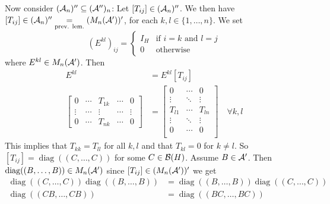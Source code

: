 \documentclass[10pt,english,a4paper]{article}
\theoremstyle{definition}
\DeclareMathOperator{\diag}{diag}
\begin{document}
Now consider $(\mathcal{A}_n)'' \subseteq (\mathcal{A}'')_n$:
Let $[T_{ij}] \in (\mathcal{A}_n)''$. We then have 
$[T_{ij}] \in (\mathcal{A}_n)'' \underset{\text{prev. lem.}}{=} (M_n(\mathcal{A}'))'$, for 
each $k,l \in \{1,\ldots,n\}$. 
We set 
\[(E^{kl})_{ij} = \begin{cases} 
I_H &  \text{if } i =k \text{ and } l=j \\
 0 &\text{otherwise} \end{cases}\] 
where $E^{kl} \in M_{n}(\mathcal{A}')$. Then 
\begin{align*}
    [T_{ij}]E^{kl} &= E^{kl}[T_{ij}] \\
    \begin{bmatrix} 
       0 &\cdots & T_{1k} &\cdots & 0 \\
       \vdots &\cdots & \vdots &\cdots &\vdots \\
       0 &\cdots & T_{nk} & \cdots & 0
    \end{bmatrix}
&=
    \begin{bmatrix} 
       0   &\cdots & 0 \\
       \vdots &\ddots &\vdots \\
       T_{l1} &  \cdots & T_{ln} \\
       \vdots  &\ddots &\vdots \\
       0   &\cdots & 0 \\
    \end{bmatrix}
\quad\forall k,l
\end{align*}
This implies that $T_{kk} = T_{ll}$ for all $k,l$
and that $T_{kl} = 0$ for $k\neq l$.
So $[T_{ij}] = \diag((C,\ldots,C))$
for some $C \in \mathcal{B}(H)$. Assume $B \in \mathcal{A}'$. Then $\diag((B,\ldots,B))\in M_n(\As')$
since $[T_{ij}] \in (M_n(\mathcal{A}'))'$ we get 
\begin{align*}
    \diag((C,\ldots, C))\diag((B,\ldots, B))
&= \diag((B,\ldots, B))\diag((C,\ldots, C))  \\
\diag((CB,\ldots, CB)) &= \diag((BC,\ldots, BC)) 
\end{align*}
\end{document}

